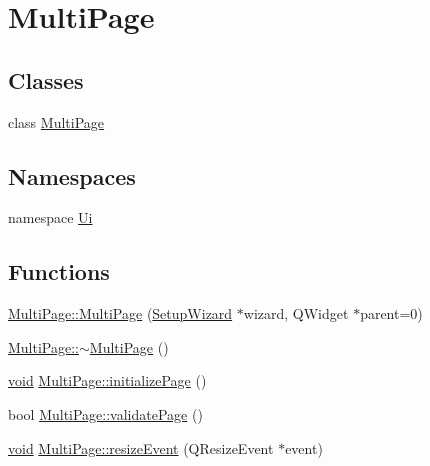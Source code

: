 \hypertarget{group___multi_page}{\section{\-Multi\-Page}
\label{group___multi_page}
}
\subsection*{\-Classes}
\begin{DoxyCompactItemize}
\item 
class \hyperlink{class_multi_page}{\-Multi\-Page}
\end{DoxyCompactItemize}
\subsection*{\-Namespaces}
\begin{DoxyCompactItemize}
\item 
namespace \hyperlink{namespace_ui}{\-Ui}
\end{DoxyCompactItemize}
\subsection*{\-Functions}
\begin{DoxyCompactItemize}
\item 
\hyperlink{group___multi_page_ga67a3b947f1068a2da86e80b181056859}{\-Multi\-Page\-::\-Multi\-Page} (\hyperlink{class_setup_wizard}{\-Setup\-Wizard} $\ast$wizard, \-Q\-Widget $\ast$parent=0)
\item 
\hyperlink{group___multi_page_ga6823cea164d1876265dc9606cc878278}{\-Multi\-Page\-::$\sim$\-Multi\-Page} ()
\item 
\hyperlink{group___u_a_v_objects_plugin_ga444cf2ff3f0ecbe028adce838d373f5c}{void} \hyperlink{group___multi_page_gae0380b77afc297043f95c8807031e3dc}{\-Multi\-Page\-::initialize\-Page} ()
\item 
bool \hyperlink{group___multi_page_ga07b9bef6a8d037baebbb6ca9470c6a48}{\-Multi\-Page\-::validate\-Page} ()
\item 
\hyperlink{group___u_a_v_objects_plugin_ga444cf2ff3f0ecbe028adce838d373f5c}{void} \hyperlink{group___multi_page_ga29d29742f1cbfe57833315d3d48f9215}{\-Multi\-Page\-::resize\-Event} (\-Q\-Resize\-Event $\ast$event)
\end{DoxyCompactItemize}


